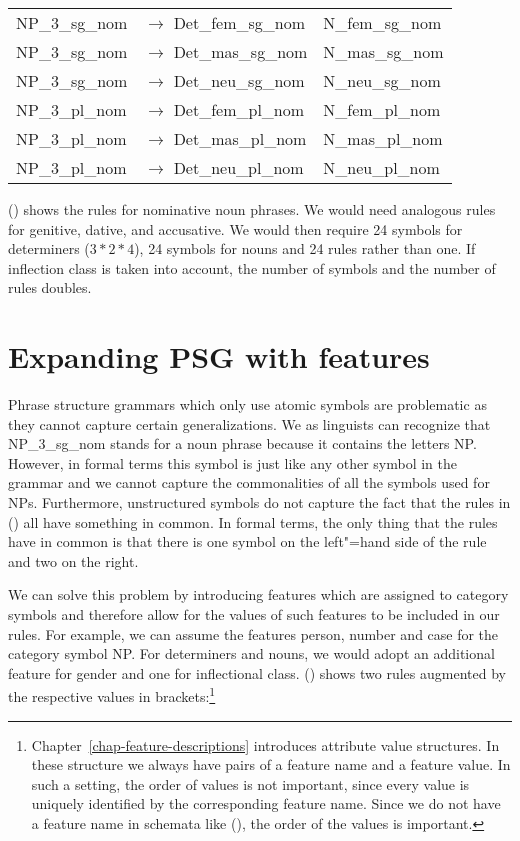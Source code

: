\begin{tabular}[t]{@{}l@{ }l@{~~}l}
NP\_3\_sg\_nom  & $\to$ Det\_fem\_sg\_nom & N\_fem\_sg\_nom \\
NP\_3\_sg\_nom  & $\to$ Det\_mas\_sg\_nom & N\_mas\_sg\_nom \\
NP\_3\_sg\_nom  & $\to$ Det\_neu\_sg\_nom & N\_neu\_sg\_nom \\
NP\_3\_pl\_nom  & $\to$ Det\_fem\_pl\_nom & N\_fem\_pl\_nom \\
NP\_3\_pl\_nom  & $\to$ Det\_mas\_pl\_nom & N\_mas\_pl\_nom \\
NP\_3\_pl\_nom  & $\to$ Det\_neu\_pl\_nom & N\_neu\_pl\_nom \\[2mm]
\end{tabular}
\z
() shows the rules for nominative noun phrases. We would need analogous rules for genitive,
dative, and accusative. We would then require 24 symbols for determiners ($3*2*4$), 24 symbols for nouns and
24 rules rather than one. If inflection class is taken into account, the number of symbols and the
number of rules doubles. 

\section{Expanding PSG with features}
\label{sec-PSG-Merkmale}

Phrase structure grammars which only use atomic symbols are problematic as they cannot capture certain generalizations.
We as linguists can recognize that NP\_3\_sg\_nom stands for a noun phrase because it contains the letters NP. 
However, in formal terms this symbol is just like any other symbol in the grammar and we cannot capture the commonalities
of all the symbols used for NPs. Furthermore, unstructured symbols do not capture the fact that the rules in () 
all have something in common. In formal terms, the only thing that the rules have in common is that there is one symbol on the
left"=hand side of the rule and two on the right.

We can solve this problem by introducing features which are assigned to category symbols and therefore allow for the values of
such features to be included in our rules. For example, we can assume the features person, number and case for the category
symbol NP. For determiners and nouns, we would adopt an additional feature for gender and one for
inflectional class. () shows two rules augmented by the respective values in brackets:\footnote{%
  Chapter~\ref{chap-feature-descriptions} introduces attribute value structures. In these structure we always
have pairs of a feature name and a feature value. In such a setting, the order of values is not
important, since every value is uniquely identified by the corresponding feature name. Since we do not have a feature name
in schemata like (), the order of the values is important.
}

